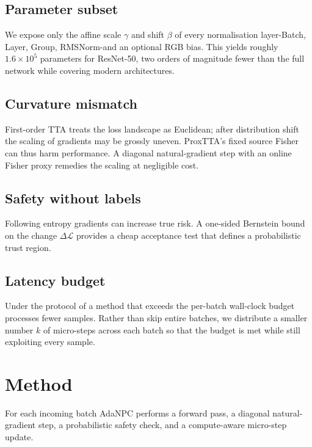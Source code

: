 \documentclass{article} %
\begin{document}
\subsection{Parameter subset}
We expose only the affine scale \(\gamma\) and shift \(\beta\) of every normalisation layer-Batch, Layer, Group, RMSNorm-and an optional RGB bias. This yields roughly \(1.6\times10^5\) parameters for ResNet-50, two orders of magnitude fewer than the full network while covering modern architectures.
\subsection{Curvature mismatch}
First-order TTA treats the loss landscape as Euclidean; after distribution shift the scaling of gradients may be grossly uneven. ProxTTA’s fixed source Fisher can thus harm performance. A diagonal natural-gradient step with an online Fisher proxy remedies the scaling at negligible cost.
\subsection{Safety without labels}
Following entropy gradients can increase true risk. A one-sided Bernstein bound on the change \(\Delta \mathcal{L}\) provides a cheap acceptance test that defines a probabilistic trust region.
\subsection{Latency budget}
Under the protocol of \cite{alfarra-2023-evaluation} a method that exceeds the per-batch wall-clock budget processes fewer samples. Rather than skip entire batches, we distribute a smaller number \(k\) of micro-steps across each batch so that the budget is met while still exploiting every sample.

\section{Method}
\label{sec:method}
For each incoming batch AdaNPC performs a forward pass, a diagonal natural-gradient step, a probabilistic safety check, and a compute-aware micro-step update.
\end{document}
